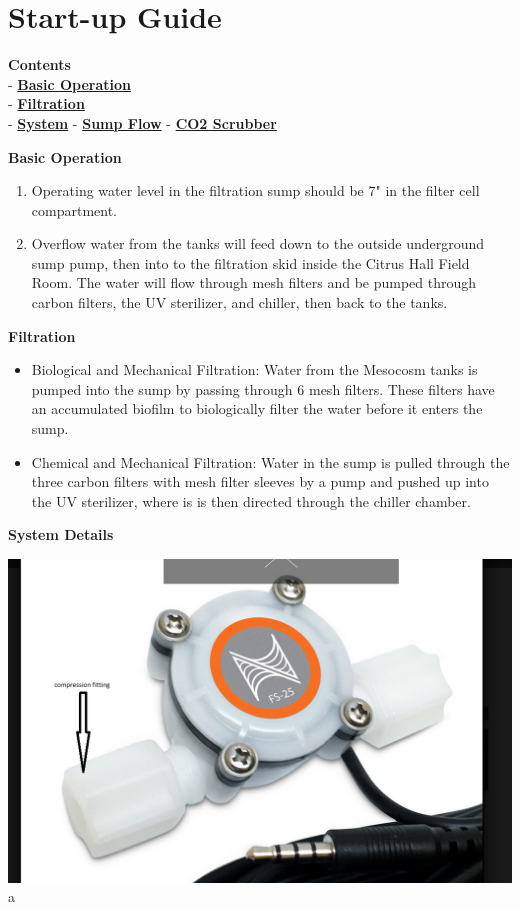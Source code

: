\documentclass[]{book}
\providecommand{\tightlist}{%
  \setlength{\itemsep}{0pt}\setlength{\parskip}{0pt}}
\begin{document}
\chapter{Start-up Guide}\label{start-up-guide}

\textbf{Contents}\\
- \protect\hyperlink{Basic_Operation}{\textbf{Basic Operation}}\\
- \protect\hyperlink{Filtration}{\textbf{Filtration}}\\
- \protect\hyperlink{System}{\textbf{System}} -
\protect\hyperlink{Sump_Flow}{\textbf{Sump Flow}} -
\protect\hyperlink{CO2_Scrubber}{\textbf{CO2 Scrubber}}

 \textbf{Basic Operation}

\begin{enumerate}
\def\labelenumi{\arabic{enumi}.}
\tightlist
\item
  Operating water level in the filtration sump should be 7" in the
  filter cell compartment.
\item
  Overflow water from the tanks will feed down to the outside
  underground sump pump, then into to the filtration skid inside the
  Citrus Hall Field Room. The water will flow through mesh filters and
  be pumped through carbon filters, the UV sterilizer, and chiller, then
  back to the tanks.
\end{enumerate}

 \textbf{Filtration}

\begin{itemize}
\tightlist
\item
  Biological and Mechanical Filtration: Water from the Mesocosm tanks is
  pumped into the sump by passing through 6 mesh filters. These filters
  have an accumulated biofilm to biologically filter the water before it
  enters the sump.
\item
  Chemical and Mechanical Filtration: Water in the sump is pulled
  through the three carbon filters with mesh filter sleeves by a pump
  and pushed up into the UV sterilizer, where is is then directed
  through the chiller chamber.
\end{itemize}

 \textbf{System Details}

\includegraphics{images/flowmeter.PNG} a
\end{document}
